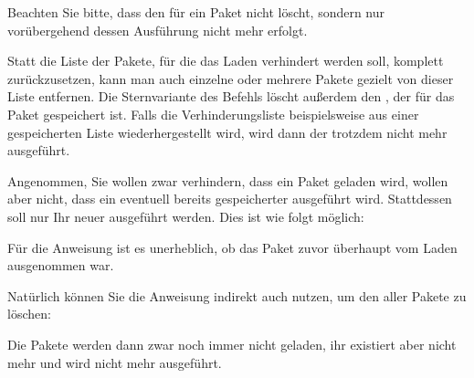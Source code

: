 Beachten Sie bitte, dass
 den  für ein
Paket nicht löscht, sondern nur vorübergehend dessen Ausführung nicht mehr
erfolgt.%
\EndIndexGroup


\begin{Declaration}
\end{Declaration}
Statt die Liste der Pakete, für die das
Laden verhindert werden soll, komplett zurückzusetzen, kann man auch
einzelne oder mehrere Pakete gezielt von dieser Liste entfernen. Die
Sternvariante des Befehls löscht außerdem den , der für
das Paket gespeichert ist. Falls die Verhinderungsliste beispielsweise aus
einer gespeicherten Liste wiederhergestellt wird, wird dann der
 trotzdem nicht mehr ausgeführt.%
%
\begin{Example}
  Angenommen, Sie wollen zwar verhindern, dass ein Paket 
  geladen wird, wollen aber nicht, dass ein eventuell bereits gespeicherter
   ausgeführt wird. Stattdessen soll nur Ihr neuer
   ausgeführt werden. Dies ist wie folgt möglich:
\begin{lstcode}
\end{lstcode}
  Für die Anweisung  ist es unerheblich,
  ob das Paket zuvor überhaupt vom Laden ausgenommen war.

  Natürlich können Sie die Anweisung indirekt auch nutzen, um den
   aller Pakete zu löschen:
\begin{lstcode}
  \StorePreventPackageFromLoading\TheWholePreventList
  \UnPreventPackageFromLoading*{\TheWholePreventList}
  \PreventPackageFromLoading{\TheWholePreventList}
\end{lstcode}
  Die Pakete werden dann zwar noch immer nicht geladen, ihr
   existiert aber nicht mehr und wird nicht mehr
  ausgeführt.%
\end{Example}%
\EndIndexGroup
%
\EndIndexGroup


